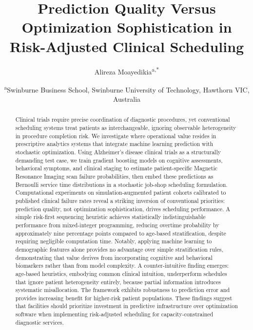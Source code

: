 \documentclass[11pt,a4paper]{article}
\title{Prediction Quality Versus Optimization Sophistication in Risk-Adjusted Clinical Scheduling}
\author{Alireza Moayedikia\textsuperscript{a,*}}
\date{\vspace{-1em}\small \textsuperscript{a}Swinburne Business School, Swinburne University of Technology, Hawthorn VIC, Australia}
\begin{document}
\maketitle

\renewcommand{\thefootnote}{*}
\renewcommand{\thefootnote}{\arabic{footnote}}

\begin{abstract}
Clinical trials require precise coordination of diagnostic procedures, yet conventional scheduling systems treat patients as interchangeable, ignoring observable heterogeneity in procedure completion risk. We investigate where operational value resides in prescriptive analytics systems that integrate machine learning prediction with stochastic optimization. Using Alzheimer's disease clinical trials as a structurally demanding test case, we train gradient boosting models on cognitive assessments, behavioral symptoms, and clinical staging to estimate patient-specific Magnetic Resonance Imaging scan failure probabilities, then embed these predictions as Bernoulli service time distributions in a stochastic job-shop scheduling formulation. Computational experiments on simulation-augmented patient cohorts calibrated to published clinical failure rates reveal a striking inversion of conventional priorities: prediction quality, not optimization sophistication, drives scheduling performance. A simple risk-first sequencing heuristic achieves statistically indistinguishable performance from mixed-integer programming, reducing overtime probability by approximately nine percentage points compared to age-based stratification, despite requiring negligible computation time. Notably, applying machine learning to demographic features alone provides no advantage over simple stratification rules, demonstrating that value derives from incorporating cognitive and behavioral biomarkers rather than from model complexity. A counter-intuitive finding emerges: age-based heuristics, embodying common clinical intuition, underperform schedules that ignore patient heterogeneity entirely, because partial information introduces systematic misallocation. The framework exhibits robustness to prediction error and provides increasing benefit for higher-risk patient populations. These findings suggest that facilities should prioritize investment in predictive infrastructure over optimization software when implementing risk-adjusted scheduling for capacity-constrained diagnostic services.
\end{abstract}
\end{document}
